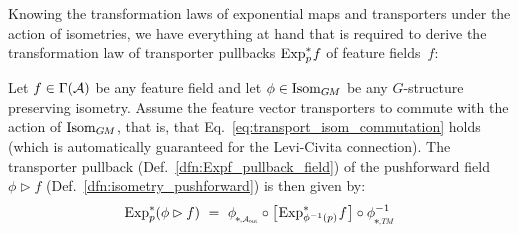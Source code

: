 Knowing the transformation laws of exponential maps and transporters under the action of isometries, we have everything at hand that is required to derive the transformation law of transporter pullbacks $\operatorname{Exp}^*_p\mkern-2mu f$ of feature fields~$f$:
\begin{thm}
\label{thm:transporter_pullback_isometry_action}
    Let $f\in \Gamma(\mathcal{A})$ be any feature field and let $\phi \in \operatorname{Isom}_{G\mkern-1.4muM}$ be any $G$-structure preserving isometry.
    Assume the feature vector transporters to commute with the action of $\operatorname{Isom}_{G\mkern-1.4muM}$, that is, that Eq.~\eqref{eq:transport_isom_commutation} holds
    (which is automatically guaranteed for the Levi-Civita connection).
    The transporter pullback (Def.~\ref{dfn:Expf_pullback_field}) of the pushforward field $\phi\rhd \!f$ (Def.~\ref{dfn:isometry_pushforward}) is then given by:
    \begin{align}\label{eq:transporter_pullback_isometry_commutativity}
        \Expsp (\phi \rhd f)
        \ =\ 
        \dphiAout \!\circ \big[\mkern-2mu \Expsphiinvpf \mkern1mu\big] \circ \dphiTM^{-1}
    \end{align}
\end{thm}
